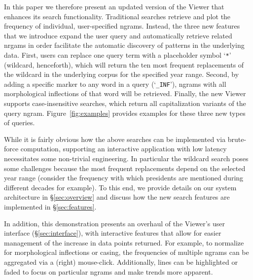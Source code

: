 \documentclass[11pt]{article}
\begin{document}
In this paper we therefore present an updated version of the Viewer that enhances its search functionality. Traditional searches retrieve and plot the frequency of individual, user-specified ngrams. Instead, the three new features that we introduce expand the user query and automatically retrieve related nrgams in order facilitate the automatic discovery of patterns in the underlying data. First, users can replace one query term with a placeholder symbol `\texttt{*}' (wildcard, henceforth), which will return the ten most frequent replacements of the wildcard in the underlying corpus for the specified year range. Second, by adding a specific marker to any word in a query (`\texttt{\_INF}'), ngrams with all morphological inflections of that word will be retrieved. Finally, the new Viewer supports case-insensitive searches, which return all capitalization variants of the query ngram. Figure~\ref{fig:examples} provides examples for these three new types of queries.

While it is fairly obvious how the above searches can be implemented via brute-force computation, supporting an interactive application with low latency necessitates some non-trivial engineering. In particular the wildcard search poses some challenges because the most frequent replacements depend on the selected year range (consider the frequency with which presidents are mentioned during different decades for example). To this end, we provide details on our system architecture in \S\ref{sec:overview}  and discuss how the new search features are implemented in \S\ref{sec:features}.

In addition, this demonstration presents an overhaul of the Viewer's user interface (\S\ref{sec:interface}), with interactive features that allow for easier management of the increase in data points returned. For example, to normalize for morphological inflections or casing, the frequencies of multiple ngrams can be aggregated via a (right) mouse-click. Additionally, lines can be highlighted or faded to focus on particular ngrams and make trends more apparent.
\end{document}
